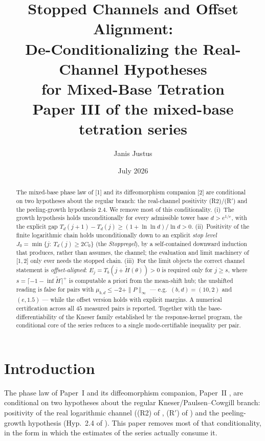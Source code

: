 \documentclass[11pt]{article}
\title{Stopped Channels and Offset Alignment:\\
De-Conditionalizing the Real-Channel Hypotheses\\
for Mixed-Base Tetration\\[2mm]
\large Paper III of the mixed-base tetration series}
\author{Janis Justus}
\date{July 2026}
\begin{document}
\maketitle

\begin{abstract}
The mixed-base phase law of [1] and its diffeomorphism companion [2] are
conditional on two hypotheses about the regular branch: the real-channel
positivity (R2)/(R$'$) and the peeling-growth hypothesis 2.4.  We remove most
of this conditionality.  (i)~The growth hypothesis holds unconditionally for
every admissible tower base $d>e^{1/e}$, with the explicit gap
$T_d(j{+}1)-T_d(j)\ge(1+\ln\ln d)/\ln d>0$.  (ii)~Positivity of the finite
logarithmic chain holds unconditionally down to an explicit \emph{stop level}
$J_0=\min\{j:\ T_d(j)\ge 2C_0\}$ (the \emph{Stoppregel}), by a self-contained
downward induction that produces, rather than assumes, the channel; the
evaluation and limit machinery of [1,\,2] only ever needs the stopped chain.
(iii)~For the limit objects the correct channel statement is
\emph{offset-aligned}: $E_j=T_b(j+\widetilde H(\theta))>0$ is required only
for $j\ge s$, where $s=\lceil -1-\inf\widetilde H\rceil^{+}$ is computable
a priori from the mean-shift hub; the unshifted reading is false for pairs
with $\mu_{b,d}\le-2+\|P\|_\infty$ --- e.g.\ $(b,d)=(10,2)$ and $(e,1.5)$ ---
while the offset version holds with explicit margins.  A numerical
certification across all $45$ measured pairs is reported.  Together with the
base-differentiability of the Kneser family established by the response-kernel
program, the conditional core of the series reduces to a single
mode-certifiable inequality per pair.
\end{abstract}

\section{Introduction}

The phase law of Paper~I \cite{paper} and its diffeomorphism companion,
Paper~II \cite{unified}, are conditional on two hypotheses about the
regular Kneser/Paulsen--Cowgill branch: positivity of the real logarithmic
channel ((R2) of \cite{paper}, (R$'$) of \cite{unified}) and the
peeling-growth hypothesis (Hyp.~2.4 of \cite{paper}). This paper removes
most of that conditionality, in the form in which the estimates of the
series actually consume it.
\end{document}
